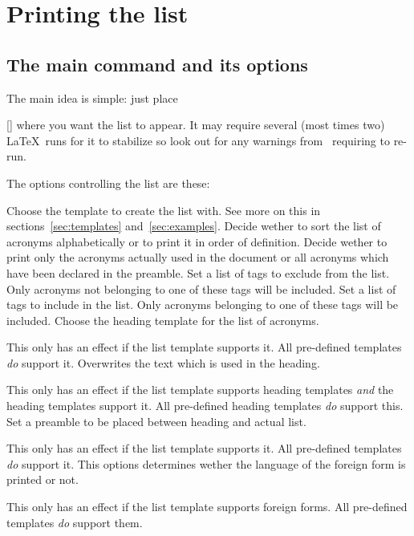 \documentclass{acro-manual}
\begin{document}
\section{Printing the list}\label{sec:printing-list}
\subsection{The main command and its options}\label{sec:main-list}
The main idea is simple: just place
\begin{commands}
  []
    where you want the list to appear.  It may require several (most times
    two) \LaTeX\ runs for it to stabilize so look out for any warnings
    from \acro\ requiring to re-run.
\end{commands}
The options controlling the list are these:
\begin{options}
    Choose the template to create the list with.  See more on this in
    sections~\vref{sec:templates} and~\vref{sec:examples}.
    Decide wether to sort the list of acronyms alphabetically or to print it
    in order of definition.
    Decide wether to print only the acronyms actually used in the document or
    all acronyms which have been declared in the preamble.
  \Default
    Set a list of tags to exclude from the list.  Only acronyms not
    belonging to one of these tags will be included.
  \Default
    Set a list of tags to include in  the list.  Only acronyms belonging to
    one of these tags will be included.
    Choose the heading template for the list of acronyms.

    This only has an effect if the list template supports it.  All pre-defined
    templates \emph{do} support it.
    Overwrites the text which is used in the heading.

    This only has an effect if the list template supports heading templates
    \emph{and} the heading templates support it.  All pre-defined heading
    templates \emph{do} support this.
  \Default
    Set a preamble to be placed between heading and actual list.

    This only has an effect if the list template supports it.  All pre-defined
    templates \emph{do} support it.
    This options determines wether the language of the foreign form is printed
    or not.

    This only has an effect if the list template supports foreign forms.  All
    pre-defined templates \emph{do} support them.
\end{options}
\end{document}

